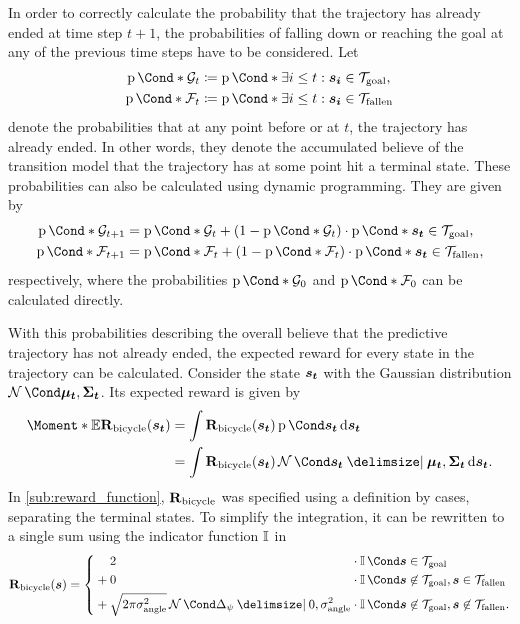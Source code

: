 In order to correctly calculate the probability that the trajectory has already ended at time step $t+1$, the probabilities of falling down or reaching the goal at any of the previous time steps have to be considered.
Let
\begin{align}
    \Prob*{\PGoal_t} &\coloneqq \Prob*{\exists i \leq t : \mat{s_i} \in \Goal}, \\
    \Prob*{\PFallen_t} &\coloneqq \Prob*{\exists i \leq t : \mat{s_i} \in \Fallen}
\end{align}
denote the probabilities that at any point before or at $t$, the trajectory has already ended.
In other words, they denote the accumulated believe of the transition model that the trajectory has at some point hit a terminal state.
These probabilities can also be calculated using dynamic programming.
They are given by
\begin{align}
    \Prob*{\PGoal_{t+1}} &= \Prob*{\PGoal_{t}} + \left( 1 - \Prob*{\PGoal_{t}}  \right) \cdot \Prob*{\mat{s_t} \in \Goal}, \\
    \Prob*{\PFallen_{t+1}} &= \Prob*{\PFallen_{t}} + \left( 1 - \Prob*{\PFallen_{t}}  \right) \cdot \Prob*{\mat{s_t} \in \Fallen},
\end{align}
respectively, where the probabilities $\Prob*{\PGoal_{0}}$ and $\Prob*{\PFallen_{0}}$ can be calculated directly.

With this probabilities describing the overall believe that the predictive trajectory has not already ended, the expected reward for every state in the trajectory can be calculated.
Consider the state $\bm{s_t}$ with the Gaussian distribution $\Gaussian{\mat{\mu_t}, \mat{\Sigma_t}}$.
Its expected reward is given by
\begin{align}
    \Moment*{\E}{\RwdBicycle(\rv{s_t})} &= \int \RwdBicycle(\rv{s_t}) \Prob{\rv{s_t}} \diff \rv{s_t} \\
    &= \int \RwdBicycle(\rv{s_t}) \Gaussian{\rv{s_t} \given \mat{\mu_t}, \mat{\Sigma_t}} \diff \rv{s_t}.
\end{align}
In \cref{sub:reward_function}, $\operatorname{\operatorname{\mathbf{R}}_{\text{bicycle}}}$ was specified using a definition by cases, separating the terminal states.
To simplify the integration, it can be rewritten to a single sum using the indicator function $\operatorname{\mathbb{I}}$ in
\begin{align}
    \RwdBicycle(\mat{s}) = \left\{ \begin{alignedat}{3}
            &&& 2 &&\cdot \Indicator{\rv{s} \in \Goal} \\
            &&{}+{}& 0 &&\cdot \Indicator{\rv{s} \not\in\Goal, \rv{s} \in \Fallen} \\
            &&{}+{}& \sqrt{2\pi\sigma_{\text{angle}}^2}\Gaussian{\Delta_\psi \given 0, \sigma_{\text{angle}}^2} &&\cdot \Indicator{\rv{s} \not\in\Goal, \rv{s} \not\in\Fallen}.
        \end{alignedat}\right.
\end{align}

